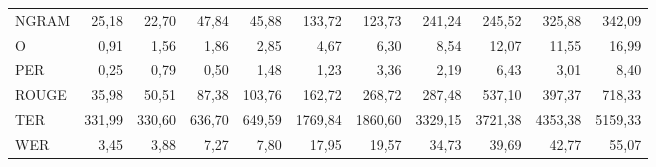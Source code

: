 \documentclass[11pt,a4paper]{article}
\begin{document}
\begin{table}[H]
{\begin{tabular}{l r r | r r | r r | r r | r r }
NGRAM  & 25,18         & 22,70        & 47,84         & 45,88         & 133,72        & 123,73        & 241,24         & 245,52        & 325,88         & 342,09        \\
O      & 0,91          & 1,56         & 1,86          & 2,85          & 4,67          & 6,30          & 8,54           & 12,07         & 11,55          & 16,99         \\
PER    & 0,25          & 0,79         & 0,50          & 1,48          & 1,23          & 3,36          & 2,19           & 6,43          & 3,01           & 8,40          \\
ROUGE  & 35,98         & 50,51        & 87,38         & 103,76        & 162,72        & 268,72        & 287,48         & 537,10        & 397,37         & 718,33        \\
TER    & 331,99        & 330,60       & 636,70        & 649,59        & 1769,84       & 1860,60       & 3329,15        & 3721,38       & 4353,38        & 5159,33       \\
WER    & 3,45          & 3,88         & 7,27          & 7,80          & 17,95         & 19,57         & 34,73          & 39,69         & 42,77          & 55,07        \\ \hline
\end{tabular}}
\label{table:Ex1-ws_corpus1000}
\normalsize
\end{table}
\end{document}
